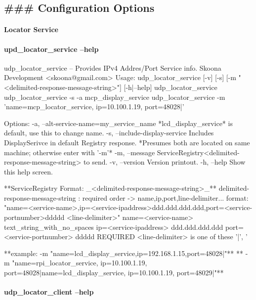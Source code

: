 \subsection*{\#\#\# Configuration Options }

\paragraph*{Locator Service}



\paragraph*{upd\+\_\+locator\+\_\+service --help}

\begin{DoxyVerb}udp_locator_service -- Provides IPv4 Addres/Port Service info.
          Skoona Development <skoona@gmail.com>
Usage:
  udp_locator_service [-v] [-s] [-m "<delimited-response-message-string>"] [-h|--help]
  udp_locator_service 
  udp_locator_service -s -a mcp_display_service
  udp_locator_service -m 'name=mcp_locator_service, ip=10.100.1.19, port=48028|'

Options:
  -a, --alt-service-name=my_service_name
                 *lcd_display_service* is default, use this to change name.
  -s, --include-display-service  Includes DisplaySerivce in default Registry response.
                *Presumes both are located on same machine; otherwise enter with '-m'*
  -m, --message  ServiceRegistry<delimited-response-message-string> to send.
  -v, --version  Version printout.
  -h, --help     Show this help screen.

  **ServiceRegistry Format:  _<delimited-response-message-string>_**
    delimited-response-message-string : required order -> name,ip,port,line-delimiter...
      format: "name=<service-name>,ip=<service-ipaddress>ddd.ddd.ddd.ddd,port=<service-portnumber>ddddd <line-delimiter>"
        name=<service-name> text_string_with_no_spaces
        ip=<service-ipaddress> ddd.ddd.ddd.ddd
        port=<service-portnumber> ddddd
      REQUIRED   <line-delimiter> is one of these '|', '%

    **example: -m "name=lcd_display_service,ip=192.168.1.15,port=48028|"**
    ** -m "name=rpi_locator_service, ip=10.100.1.19, port=48028|name=lcd_display_service, ip=10.100.1.19, port=48029|"**
\end{DoxyVerb}


\paragraph*{udp\+\_\+locator\+\_\+client --help}

